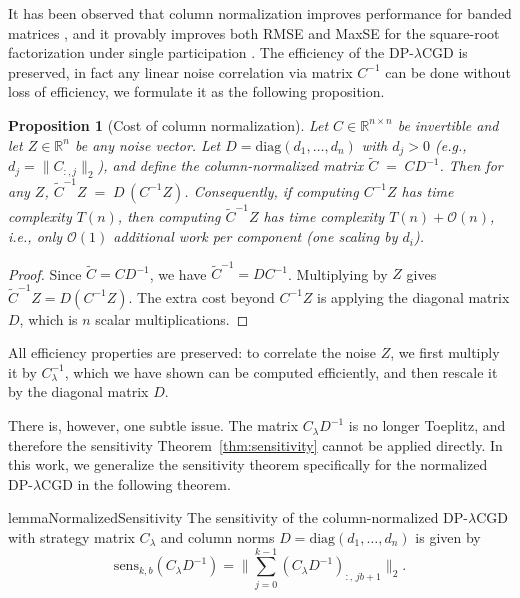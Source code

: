 \documentclass{article}
\theoremstyle{plain}
\newtheorem{proposition}[theorem]{Proposition}
\theoremstyle{definition}
\theoremstyle{remark}
\newcommand{\method}{DP-$\lambda$CGD\xspace}
\begin{document}
It has been observed that column normalization improves performance for banded
matrices \citep{pillutla2025correlated}, and it provably improves both RMSE and
MaxSE for the square-root factorization under single participation
\citep{henzinger2025normalized}. The efficiency of the \method is preserved, in fact any linear noise correlation via matrix $C^{-1}$ can be done without loss of efficiency, we formulate it as the following proposition.

\begin{proposition}[Cost of column normalization]
Let $C\in\mathbb{R}^{n\times n}$ be invertible and let $Z\in\mathbb{R}^n$ be any noise vector.
Let $D=\mathrm{diag}(d_1,\dots,d_n)$ with $d_j>0$ (e.g., $d_j=\|C_{:,j}\|_2$), and define the
column-normalized matrix $\widetilde C \;=\; C D^{-1}$.
Then for any $Z$, $
\widetilde C^{-1} Z \;=\; D\,(C^{-1}Z)$.
Consequently, if computing $C^{-1}Z$ has time complexity $T(n)$, then computing
$\widetilde C^{-1}Z$ has time complexity $T(n)+\mathcal{O}(n)$, i.e., only $\mathcal{O}(1)$
additional work per component (one scaling by $d_i$).
\end{proposition}

\begin{proof}
Since $\widetilde C = C D^{-1}$, we have $\widetilde C^{-1} = D C^{-1}$. Multiplying by $Z$
gives $\widetilde C^{-1}Z = D(C^{-1}Z)$. The extra cost beyond $C^{-1}Z$ is applying the
diagonal matrix $D$, which is $n$ scalar multiplications.
\end{proof}


All efficiency properties are preserved: to correlate the noise $Z$, we first
multiply it by $C_\lambda^{-1}$, which we have shown can be computed
efficiently, and then rescale it by the diagonal matrix $D$.

There is, however, one subtle issue. The matrix $C_\lambda D^{-1}$ is no longer
Toeplitz, and therefore the sensitivity Theorem~\ref{thm:sensitivity} cannot be
applied directly. In this work, we generalize the sensitivity theorem specifically
for the normalized \method in the following theorem.

\begin{restatable}{lemma}{NormalizedSensitivity}
\label{lem:normalized-sensitivity}
The sensitivity of the column-normalized \method with strategy matrix $C_\lambda$ and column norms
$D = \mathrm{diag}(d_1,\dots,d_n)$ is given by
\begin{equation}
    \mathrm{sens}_{k,b}(C_\lambda D^{-1})
    =
    \Big\|
        \sum_{j=0}^{k-1} (C_\lambda D^{-1})_{:,\, jb+1}
    \Big\|_2 .
\end{equation}
\end{restatable}
\end{document}
